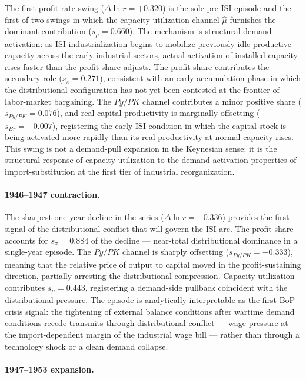 \documentclass[11pt,a4paper]{article}
\begin{document}
{The first profit-rate swing ($\Delta\ln r = +0.320$) is the sole
pre-ISI episode and the first of two swings in which the capacity
utilization channel $\hat{\mu}$ furnishes the dominant contribution
($s_\mu = 0.660$). The mechanism is structural demand-activation: as ISI
industrialization begins to mobilize previously idle productive capacity
across the early-industrial sectors, actual activation of installed capacity
rises faster than the profit share adjusts. The profit share contributes
the secondary role ($s_\pi = 0.271$), consistent with an early accumulation
phase in which the distributional configuration has not yet been contested
at the frontier of labor-market bargaining. The $Py/PK$ channel contributes
a minor positive share ($s_{Py/PK} = 0.076$), and real capital productivity
is marginally offsetting ($s_{Br} = -0.007$), registering the early-ISI
condition in which the capital stock is being activated more rapidly than
its real productivity at normal capacity rises. This swing is not a
demand-pull expansion in the Keynesian sense: it is the structural response
of capacity utilization to the demand-activation properties of
import-substitution at the first tier of industrial reorganization.

\paragraph{1946--1947 contraction.}

The sharpest one-year decline in the series ($\Delta\ln r = -0.336$)
provides the first signal of the distributional conflict that will govern
the ISI arc. The profit share accounts for $s_\pi = 0.884$ of the decline
--- near-total distributional dominance in a single-year episode. The
$Py/PK$ channel is sharply offsetting ($s_{Py/PK} = -0.333$), meaning that
the relative price of output to capital moved in the profit-sustaining
direction, partially arresting the distributional compression. Capacity
utilization contributes $s_\mu = 0.443$, registering a demand-side pullback
coincident with the distributional pressure. The episode is analytically
interpretable as the first BoP-crisis signal: the tightening of external
balance conditions after wartime demand conditions recede transmits through
distributional conflict --- wage pressure at the import-dependent margin of
the industrial wage bill --- rather than through a technology shock or a
clean demand collapse.

\paragraph{1947--1953 expansion.}

}
\end{document}

